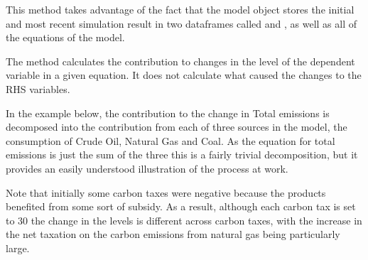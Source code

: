 \documentclass[letterpaper,10pt,english]{jupyterBook}
\begin{document}
\sphinxAtStartPar
This method takes advantage of the fact that the model object stores the initial and most recent simulation result in two dataframes called  and , as well as all of the equations of the model.

\sphinxAtStartPar
The  method calculates the contribution to changes in the level of the dependent variable in a given equation. It does not calculate what caused the changes to the RHS variables.

\sphinxAtStartPar
In the example below, the contribution to the change in Total emissions is decomposed into the contribution from each of three sources in the model, the consumption of Crude Oil, Natural Gas and Coal.  As the equation for total emissions is just the sum of the three this is a fairly trivial decomposition, but it provides an easily understood illustration of the process at work.

\sphinxAtStartPar
Note that initially some carbon taxes were negative because the products benefited from some sort of subsidy.  As a result, although each carbon tax is set to 30 the change in the levels is different across carbon taxes, with the increase in the net taxation on the carbon emissions from natural gas being particularly large.
\end{document}

